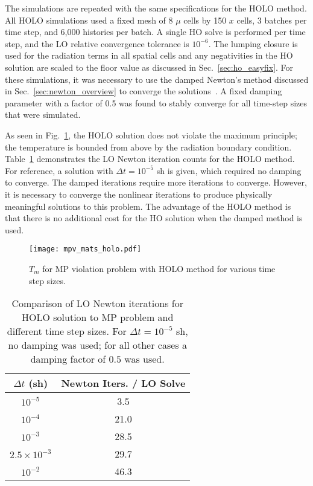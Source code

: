 The simulations are repeated with the same specifications for the HOLO method. All HOLO
simulations used a fixed mesh of 8 $\mu$ cells by 150 $x$ cells, 3 batches per time step,
and 6,000 histories per batch. A single HO solve is performed per time step, and the LO
relative convergence tolerance is $10^{-6}$. The lumping closure is used for the radiation
terms in all spatial cells and any negativities in the HO solution are scaled to the floor
value as discussed in Sec.~\ref{sec:ho_easyfix}.  For these simulations, it was
necessary to use the damped Newton's method discussed in Sec.~\ref{sec:newton_overview} to converge the solutions~\cite{damped_newton}. 
 A fixed damping parameter with a factor of 0.5 was found to stably converge for all
 time-step sizes that were simulated. 

As seen in
Fig.~\ref{fig:holo_mpv}, the HOLO solution does not violate the maximum principle; the
temperature is bounded from above by the radiation boundary condition.
Table~\ref{tab:mpv_iters} demonstrates the LO Newton iteration counts for the HOLO method.
For reference, a solution with $\Delta t = 10^{-5}$ sh is given, which required no damping
to converge.  The damped iterations require more iterations to converge.  However, it is necessary to converge the nonlinear iterations to produce
physically meaningful solutions to this problem.  The advantage of the HOLO method is that
there is no additional cost for the HO solution when the damped method is used.
\begin{figure}[htbp]
    \centering
    \texttt{[image: mpv\_mats\_holo.pdf]}
    \caption{\label{fig:holo_mpv}$T_m$ for MP violation problem with HOLO method for various time step
    sizes.}
\end{figure}
\begin{table}[htbp]
    \caption{\label{tab:mpv_iters}Comparison of LO Newton iterations for HOLO solution to 
    MP problem and different time step sizes. For $\Delta t=10^{-5}$ sh, no damping was used; for
    all other cases a damping factor of $0.5$ was used.}  
    \centering
        \begin{tabular}{|cc|} \hline
            $\Delta t$ (sh) & Newton Iters. / LO Solve \\ \hline
            $10^{-5}$    & 3.5 \\
            $10^{-4}$    & 21.0 \\
            $10^{-3}$    & 28.5 \\
            $2.5\times10^{-3}$  & 29.7 \\
            $10^{-2}$    & 46.3 \\ \hline
        \end{tabular}
\end{table}




